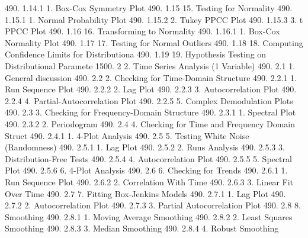 490.      1.14.1                      1. Box-Cox Symmetry Plot
490.      1.15                 15. Testing for Normality
490.      1.15.1                      1. Normal Probability Plot
490.      1.15.2                      2. Tukey PPCC Plot
490.      1.15.3                      3. t PPCC Plot
490.      1.16                 16. Transforming to Normality
490.      1.16.1                      1. Box-Cox Normality Plot
490.      1.17                 17. Testing for Normal Outliers
490.      1.18                 18. Computing Confidence Limits for Distributiona
490.      1.19                 19. Hypothesis Testing on Distributional Paramete
1500.     2               2. Time Series Analysis (1 Variable)
490.      2.1                   1. General discussion
490.      2.2                   2. Checking for Time-Domain Structure
490.      2.2.1                       1. Run Sequence Plot
490.      2.2.2                       2. Lag Plot
490.      2.2.3                       3. Autocorrelation Plot
490.      2.2.4                       4. Partial-Autocorrelation Plot
490.      2.2.5                       5. Complex Demodulation Plots
490.      2.3                   3. Checking for Frequency-Domain Structure
490.      2.3.1                       1. Spectral Plot
490.      2.3.2                       2. Periodogram
490.      2.4                   4. Checking for Time and Frequency Domain Struct
490.      2.4.1                       1. 4-Plot Analysis
490.      2.5                   5. Testing White Noise (Randomness)
490.      2.5.1                       1. Lag Plot
490.      2.5.2                       2. Runs Analysis
490.      2.5.3                       3. Distribution-Free Tests
490.      2.5.4                       4. Autocorrelation Plot
490.      2.5.5                       5. Spectral Plot
490.      2.5.6                       6. 4-Plot Analysis
490.      2.6                   6. Checking for Trends
490.      2.6.1                       1. Run Sequence Plot
490.      2.6.2                       2. Correlation With Time
490.      2.6.3                       3. Linear Fit Over Time
490.      2.7                   7. Fitting Box-Jenkins Models
490.      2.7.1                       1. Lag Plot
490.      2.7.2                       2. Autocorrelation Plot
490.      2.7.3                       3. Partial Autocorrelation Plot
490.      2.8                   8. Smoothing
490.      2.8.1                       1. Moving Average Smoothing
490.      2.8.2                       2. Least Squares Smoothing
490.      2.8.3                       3. Median Smoothing
490.      2.8.4                       4. Robust Smoothing
